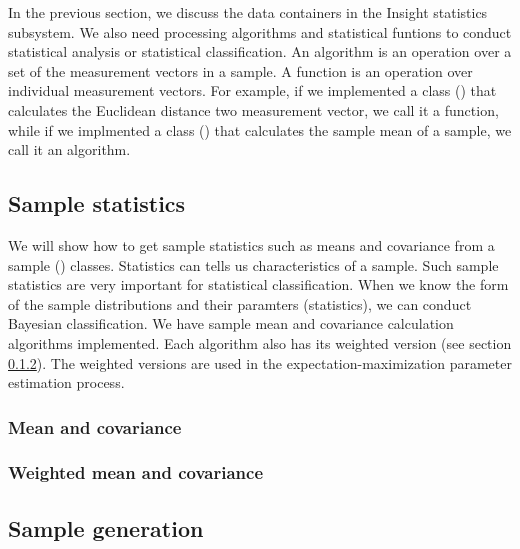 In the previous section, we discuss the data containers in the Insight
statistics subsystem. We also need processing algorithms and
statistical funtions to conduct statistical analysis or statistical
classification. An algorithm is an operation over a set of the
measurement vectors in a sample. A function is an operation over
individual measurement vectors. For example, if we implemented a class
() that calculates the
Euclidean distance two measurement vector, we call it a function,
while if we implmented a class
() that calculates the sample
mean of a sample, we call it an algorithm.

\subsection{Sample statistics}
\label{sec:SampleStatistics}

 We will show how to get sample statistics such as means and
 covariance from a sample ()
 classes. Statistics can tells us characteristics of a sample. Such
 sample statistics are very important for statistical
 classification. When we know the form of the sample distributions and
 their paramters (statistics), we can conduct Bayesian
 classification. We have sample mean and covariance calculation
 algorithms implemented. Each algorithm also has its weighted version
 (see section \ref{sec:WeightedMeanCovariance}). The weighted versions
 are used in the expectation-maximization parameter estimation
 process.

\subsubsection{Mean and covariance}
\label{sec:MeanCovariance}



\subsubsection{Weighted mean and covariance}
\label{sec:WeightedMeanCovariance}



\subsection{Sample generation}
\label{sec:SampleGeneration}

